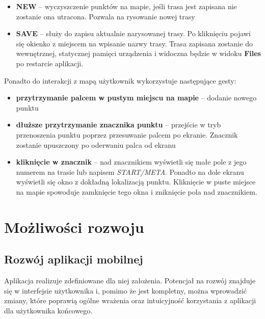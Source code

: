 \begin{itemize}
    \item \textbf{NEW} – wyczyszczenie punktów na mapie, jeśli trasa jest zapisana nie zostanie ona utracona. Pozwala na rysowanie nowej trasy
    \item \textbf{SAVE} – służy do zapisu aktualnie narysowanej trasy. Po kliknięciu pojawi się okienko z miejscem na wpisanie nazwy trasy. Trasa zapisana zostanie do wewnętrznej, statycznej pamięci urządzenia i widoczna będzie w widoku \textbf{Files} po restarcie aplikacji.
\end{itemize}
Ponadto do interakcji z mapą użytkownik wykorzystuje następujące gesty:
\begin{itemize}
    \item \textbf{przytrzymanie palcem w pustym miejscu na mapie} – dodanie nowego punktu
    \item \textbf{dłuższe przytrzymanie znacznika punktu} – przejście w tryb przenoszenia punktu poprzez przesuwanie palcem po ekranie. Znacznik zostanie upuszczony po oderwaniu palca od ekranu
    \item \textbf{kliknięcie w znacznik} – nad znacznikiem wyświetli się małe pole z jego numerem na trasie lub napisem \textit{START/META}. Ponadto na dole ekranu wyświetli się okno z dokładną lokalizacją punktu. Kliknięcie w puste miejsce na mapie spowoduje zamknięcie tego okna i zniknięcie pola nad znacznikiem.
\end{itemize}

\section{Możliwości rozwoju}

\subsection{Rozwój aplikacji mobilnej}
Aplikacja realizuje zdefiniowane dla niej założenia. Potencjał na rozwój znajduje się w interfejsie użytkownika i, pomimo że jest kompletny, można wprowadzić zmiany, które poprawią ogólne wrażenia oraz intuicyjność korzystania z aplikacji dla użytkownika końcowego.